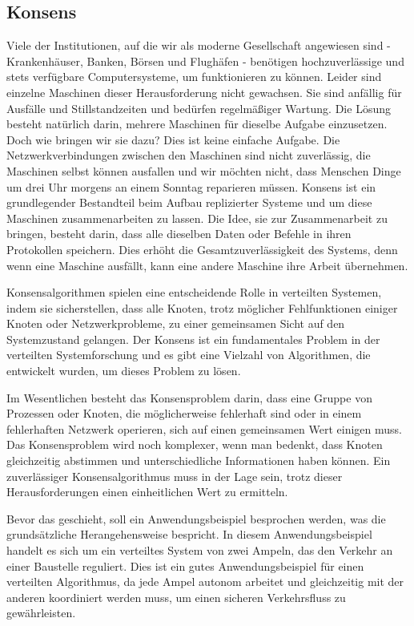 \subsection{Konsens}

Viele der Institutionen, auf die wir als moderne Gesellschaft angewiesen sind - Krankenhäuser, Banken, Börsen und Flughäfen - benötigen hochzuverlässige und stets verfügbare Computersysteme, um funktionieren zu können. Leider sind einzelne Maschinen dieser Herausforderung nicht gewachsen. Sie sind anfällig für Ausfälle und Stillstandzeiten und bedürfen regelmäßiger Wartung. Die Lösung besteht natürlich darin, mehrere Maschinen für dieselbe Aufgabe einzusetzen. Doch wie bringen wir sie dazu? Dies ist keine einfache Aufgabe. Die Netzwerkverbindungen zwischen den Maschinen sind nicht zuverlässig, die Maschinen selbst können ausfallen und wir möchten nicht, dass Menschen Dinge um drei Uhr morgens an einem Sonntag reparieren müssen. Konsens ist ein grundlegender Bestandteil beim Aufbau replizierter Systeme und um diese Maschinen zusammenarbeiten zu lassen. Die Idee, sie zur Zusammenarbeit zu bringen, besteht darin, dass alle dieselben Daten oder Befehle in ihren Protokollen speichern. Dies erhöht die Gesamtzuverlässigkeit des Systems, denn wenn eine Maschine ausfällt, kann eine andere Maschine ihre Arbeit übernehmen.

Konsensalgorithmen spielen eine entscheidende Rolle in verteilten Systemen, indem sie sicherstellen, dass alle Knoten, trotz möglicher Fehlfunktionen einiger Knoten oder Netzwerkprobleme, zu einer gemeinsamen Sicht auf den Systemzustand gelangen. Der Konsens ist ein fundamentales Problem in der verteilten Systemforschung und es gibt eine Vielzahl von Algorithmen, die entwickelt wurden, um dieses Problem zu lösen.

Im Wesentlichen besteht das Konsensproblem darin, dass eine Gruppe von Prozessen oder Knoten, die möglicherweise fehlerhaft sind oder in einem fehlerhaften Netzwerk operieren, sich auf einen gemeinsamen Wert einigen muss. Das Konsensproblem wird noch komplexer, wenn man bedenkt, dass Knoten gleichzeitig abstimmen und unterschiedliche Informationen haben können. Ein zuverlässiger Konsensalgorithmus muss in der Lage sein, trotz dieser Herausforderungen einen einheitlichen Wert zu ermitteln.

Bevor das geschieht, soll ein Anwendungsbeispiel besprochen werden, was die grundsätzliche Herangehensweise bespricht.  In diesem Anwendungsbeispiel handelt es sich um ein verteiltes System von zwei Ampeln, das den Verkehr an einer Baustelle reguliert. Dies ist ein gutes Anwendungsbeispiel für einen verteilten Algorithmus, da jede Ampel autonom arbeitet und gleichzeitig mit der anderen koordiniert werden muss, um einen sicheren Verkehrsfluss zu gewährleisten.

